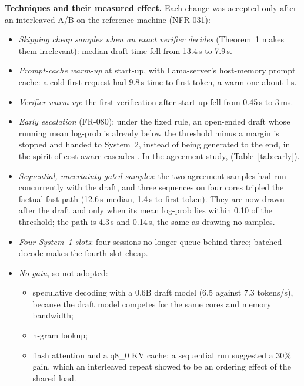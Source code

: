 \textbf{Techniques and their measured effect.} Each change was accepted only after an interleaved A/B on the
reference machine (NFR-031):
\begin{itemize}
\item \emph{Skipping cheap samples when an exact verifier decides} (Theorem~1 makes them irrelevant): median
draft time fell from 13.4\,s to 7.9\,s.
\item \emph{Prompt-cache warm-up} at start-up, with llama-server's host-memory prompt cache: a cold first request
had 9.8\,s time to first token, a warm one about 1\,s.
\item \emph{Verifier warm-up}: the first verification after start-up fell from 0.45\,s to 3\,ms.
\item \emph{Early escalation} (FR-080): under the fixed rule, an open-ended draft whose running mean log-prob is
already below the threshold minus a margin is stopped and handed to System~2, instead of being generated to the
end, in the spirit of cost-aware cascades \cite{chen2023frugalgpt,yue2024cascades}. In the agreement study, \EarlyEscSummary{} (Table~\ref{tab:early}).
\item \emph{Sequential, uncertainty-gated samples}: the two agreement samples had run concurrently with
the draft, and three sequences on four cores tripled the factual fast path (12.6\,s median, 1.4\,s to first
token). They are now drawn after the draft and only when its mean log-prob lies within 0.10 of the threshold;
the path is 4.3\,s and 0.14\,s, the same as drawing no samples.
\item \emph{Four System~1 slots}: four sessions no longer queue behind three; batched decode makes the fourth
slot cheap.
\item \emph{No gain}, so not adopted:
  \begin{itemize}
  \item speculative decoding \cite{leviathan2023speculative} with a 0.6B draft model (6.5 against 7.3 tokens/s), because the draft model
  competes for the same cores and memory bandwidth;
  \item n-gram lookup;
  \item flash attention and a q8\_0 KV cache: a sequential run suggested a 30\% gain, which an interleaved repeat
  showed to be an ordering effect of the shared load.
  \end{itemize}
\end{itemize}

\begin{table}[t]
\centering\caption{Early-escalation agreement study (open-ended prompts)}\label{tab:early}
\EarlyEscTable
\end{table}

